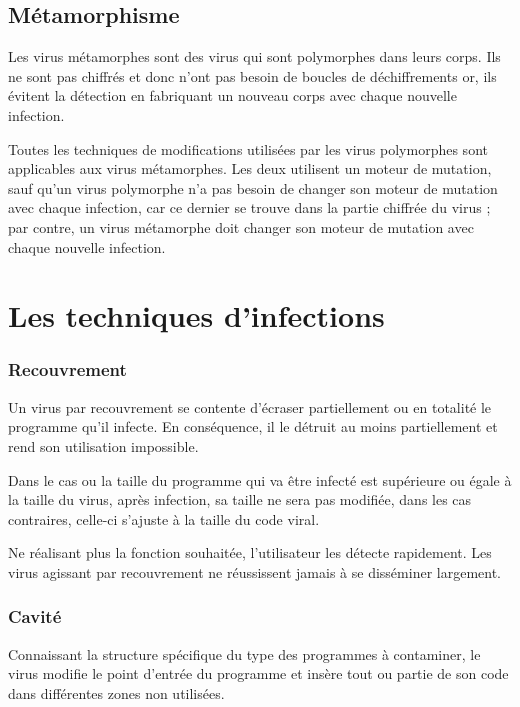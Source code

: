     \subsection{Métamorphisme}
    Les virus métamorphes sont des virus qui sont polymorphes dans leurs corps. Ils ne sont pas chiffrés et donc n'ont
    pas besoin de boucles de déchiffrements or, ils évitent la détection en fabriquant un nouveau corps avec chaque 
    nouvelle infection. \cite{virus}

    Toutes les techniques de modifications utilisées par les virus polymorphes sont applicables aux virus métamorphes. 
    Les deux utilisent un moteur de mutation, sauf qu'un virus polymorphe n'a pas besoin de changer son moteur de 
    mutation avec chaque infection, car ce dernier se trouve dans la partie chiffrée du virus ; par contre,
    un virus métamorphe doit changer son moteur de mutation avec chaque nouvelle infection.
    \cite{virus}


\section{Les techniques d'infections}

        \subsubsection{Recouvrement}
        Un virus par recouvrement se contente d’écraser partiellement ou en totalité le programme 
        qu’il infecte. En conséquence, il le détruit au moins partiellement et rend son utilisation impossible.
        \cite{virus_informatique_article} %

        Dans le cas ou la taille du programme qui va être infecté est supérieure ou égale à la taille du virus, 
        après infection, sa taille ne sera pas modifiée, dans les cas contraires, 
        celle-ci s’ajuste à la taille du code viral.\cite{virus_informatique_article} %

        Ne réalisant plus la fonction souhaitée, 
        l'utilisateur les détecte rapidement. Les virus agissant par recouvrement ne réussissent jamais 
        à se disséminer largement. %

        \subsubsection{Cavité}
        Connaissant la structure spécifique du type des programmes à contaminer, le virus modifie le point 
        d'entrée du programme et insère tout ou partie de son code dans différentes zones non utilisées.
        \cite{virus_informatique_article} %
        
